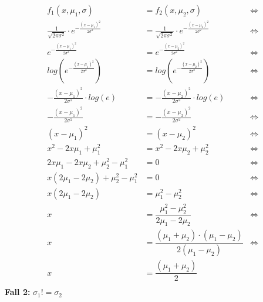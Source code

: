 \documentclass[12pt]{article}
\begin{document}
\begin{align*}
f_1(x,\mu_1,\sigma) &= f_2(x,\mu_2,\sigma) &\Leftrightarrow\\
\frac{1}{\sqrt{2 \pi \sigma^2}} \cdot e^{-\frac{(x-\mu_1)^2}{2\sigma^2}} &= \frac{1}{\sqrt{2 \pi \sigma^2}} \cdot e^{-\frac{(x-\mu_2)^2}{2 \sigma^2}} &\Leftrightarrow\\
e^{-\frac{(x-\mu_1)^2}{2\sigma^2}} &= e^{-\frac{(x-\mu_2)^2}{2 \sigma^2}} &\Leftrightarrow\\
log\left(e^{-\frac{(x-\mu_1)^2}{2\sigma^2}}\right) &= log\left(e^{-\frac{(x-\mu_2)^2}{2 \sigma^2}}\right) &\Leftrightarrow\\
-\frac{(x-\mu_1)^2}{2\sigma^2} \cdot log(e) &= -\frac{(x-\mu_2)^2}{2 \sigma^2} \cdot log(e) &\Leftrightarrow\\
-\frac{(x-\mu_1)^2}{2\sigma^2} &= -\frac{(x-\mu_2)^2}{2 \sigma^2} &\Leftrightarrow\\
(x-\mu_1)^2 &= (x-\mu_2)^2 &\Leftrightarrow\\
x^2 -2x\mu_1 + \mu_1^2 &= x^2 -2x\mu_2 + \mu_2^2 &\Leftrightarrow\\
2x\mu_1 - 2x\mu_2 + \mu_2^2 - \mu_1^2 &= 0 &\Leftrightarrow\\
x(2\mu_1 - 2\mu_2) + \mu_2^2 - \mu_1^2 &= 0 &\Leftrightarrow\\
x(2\mu_1 - 2\mu_2) &= \mu_1^2 - \mu_2^2 &\Leftrightarrow\\
x &= \dfrac{\mu_1^2 - \mu_2^2}{2\mu_1 - 2\mu_2} &\Leftrightarrow\\
x &= \dfrac{(\mu_1 + \mu_2) \cdot (\mu_1 - \mu_2)}{2(\mu_1 - \mu_2)} &\Leftrightarrow\\
x &= \dfrac{(\mu_1 + \mu_2)}{2}\\
\end{align*}
\textbf{Fall 2:} $\sigma_1 != \sigma_2$\\
\end{document}
